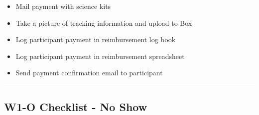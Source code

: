 \documentclass[
]{book}
\providecommand{\tightlist}{%
  \setlength{\itemsep}{0pt}\setlength{\parskip}{0pt}}
\begin{document}
\begin{itemize}
\tightlist
\item
  Mail payment with science kits
\item
  Take a picture of tracking information and upload to Box
\item
  Log participant payment in reimbursement log book
\item
  Log participant payment in reimbursement spreadsheet
\item
  Send payment confirmation email to participant
\end{itemize}

\begin{center}\rule{0.5\linewidth}{0.5pt}\end{center}

\hypertarget{w1-o-checklist---no-show}{%
\subsection{W1-O Checklist - No Show}\label{w1-o-checklist---no-show}}
\end{document}

